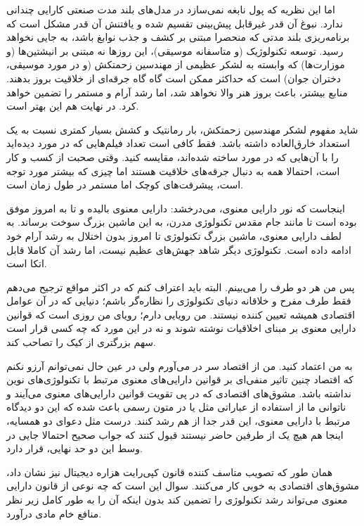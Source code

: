 اما این نظریه که پول نابغه نمی‌سازد در مدل‌های بلند مدت صنعتی کارایی
چندانی ندارد. نبوغ آن قدر غیرقابل پیش‌بینی تقسیم شده و یافتنش آن قدر
مشکل است که برنامه‌ریزی بلند مدتی که منحصرا مبتنی بر کشف و جذب نوابغ
باشد، به جایی نخواهد رسید. توسعه تکنولوژیک (و متاسفانه موسیقی)، این
روزها نه مبتنی بر انیشتین‌ها (و موزارت‌ها) که وابسته به لشکر عظیمی از
مهندسین زحمتکش (و در مورد موسیقی، دختران جوان) است که حداکثر ممکن است
گاه گاه جرقه‌ای از خلاقیت بروز بدهند. منابع بیشتر، باعث بروز هنر والا
نخواهد شد، اما رشد آرام و مستمر را تضمین خواهد کرد. در نهایت هم این
بهتر است.

شاید مفهوم لشکر مهندسین زحمتکش، بار رمانتیک و کشش بسیار کمتری نسبت به
یک استعداد خارق‌العاده داشته باشد. فقط کافی است تعداد فیلم‌هایی که در
مورد  دیده‌اید را با آن‌هایی که در مورد
 ساخته‌ شده‌اند، مقایسه کنید. وقتی صحبت از
کسب و کار است، احتمالا همه به دنبال جرقه‌های خلاقیت هستند اما چیزی که
بیشتر مورد توجه است، پیشرفت‌های کوچک اما مستمر در طول زمان است.

اینجاست که نور دارایی معنوی، می‌درخشد: دارایی معنوی بالیده و تا به
امروز موفق بوده است تا مانند جام مقدس تکنولوژی مدرن، به این ماشین بزرگ
سوخت برساند. به لطف دارایی معنوی، ماشین بزرگ تکنولوژی تا امروز بدون
اختلال به رشد آرام خود ادامه داده است. تکنولوژی دیگر شاهد جهش‌های عظیم
نیست، اما رشد آن کاملا قابل اتکا است.

پس من هر دو طرف را می‌بینم. البته باید اعتراف کنم که در اکثر مواقع
ترجیح می‌دهم فقط طرف مفرح و خلاقانه دنیای تکنولوژی را نظاره‌گر باشم؛
دنیایی که در آن عوامل اقتصادی همیشه تعیین کننده نیستند. من رویایی
دارم؛ رویای من روزی است که قوانین دارایی معنوی بر مبنای اخلاقیات نوشته
شوند و نه در این مورد که چه کسی قرار است سهم بزرگتری از کیک را تصاحب
کند.

به من اعتماد کنید. من از اقتصاد سر در می‌آورم ولی در عین حال نمی‌توانم
آرزو نکنم که اقتصاد چنین تاثیر منفی‌ای بر قوانین دارایی‌های معنوی مرتبط
با تکنولوژی‌های نوین نداشته باشد. مشوق‌های اقتصادی که در پی تقویت قوانین
دارایی‌های معنوی می‌آیند و ناتوانی ما از استفاده از عباراتی مثل
 یا  در متون رسمی باعث شده که
این دو دیدگاه مرتبط با دارایی معنوی، این قدر جدا از هم رشد کنند. درست
مثل دعوای دو همسایه، اینجا هم هیچ یک از طرفین حاضر نیستند قبول کنند که
جواب صحیح احتمالا جایی در وسط این دو حد نهایی، قرار دارد.

همان طور که تصویب متاسف کننده قانون کپی‌رایت هزاره دیجیتال نیز نشان
داد، مشوق‌های اقتصادی به خوبی کار می‌کنند. سوال این است که چه نوعی از
قانون دارایی معنوی می‌تواند رشد تکنولوژی را تضمین کند بدون اینکه آن را
به طور کامل زیر نظر منافع خام مادی درآورد.

